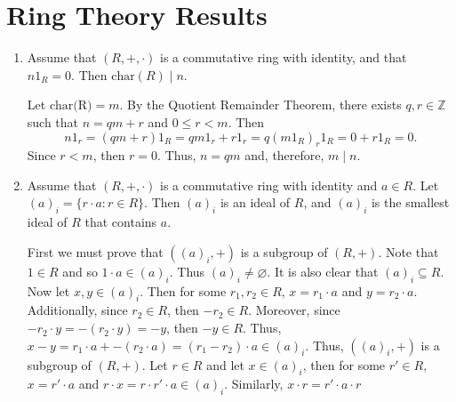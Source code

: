 \documentclass{article}
\makeatletter
\theoremstyle{definition}
\theoremstyle{remark}
\let\oldproofname=\proofname
\renewcommand{\proofname}{\bf{\textit{\oldproofname}}}
\theoremstyle{definition}
\renewenvironment{proof*}[1][\proofname]{\par
  \pushQED{\qed}%
  \normalfont \topsep6\p@\@plus6\p@\relax
  \list{}{\leftmargin=0mm
          \rightmargin=0mm
          \settowidth{\itemindent}{\itshape#1}%
          \labelwidth=\itemindent
          \parsep=0pt \listparindent=0mm%
  }
  \item[\hskip\labelsep
        \itshape
    #1\@addpunct{.}]\ignorespaces
}{%
  \popQED\endlist\@endpefalse
}
\makeatother
\begin{document}
    \section{Ring Theory Results}
        \begin{enumerate}[leftmargin=*]
            \item Assume that $(R,+,\cdot)$ is a commutative ring with identity, and that $n1_R=0$. Then $\text{char}(R)\mid n$.
                \begin{proof*}
                    Let $\text{char(R)}=m$. By the Quotient Remainder Theorem, there exists $q,r\in\mathbb{Z}$ such that $n=qm+r$ and $0\leq r <m$. Then 
                        \begin{equation*}
                            n1_r=(qm+r)1_R=qm1_r+r1_r=q(m1_R)_r1_R=0+r1_R=0.
                        \end{equation*}
                    Since $r<m$, then $r=0$. Thus, $n=qm$ and, therefore, $m\mid n$.
                \end{proof*}
                
            \item Assume that $(R,+,\cdot)$ is a commutative ring with identity and $a\in R$. Let $(a)_i=\{r\cdot a\colon r\in R\}$. Then $(a)_i$ is an ideal of $R$, and $(a)_i$ is the smallest ideal of $R$ that contains $a$.
                \begin{proof*}
                    First we must prove that $((a)_i, +)$ is a subgroup of $(R,+)$. Note that $1\in R$ and so $1\cdot a\in (a)_i$. Thus $(a)_i\neq \varnothing$. It is also clear that $(a)_i\subseteq R$. Now let $x,y\in (a)_i$. Then for some $r_1,r_2\in R$, $x=r_1\cdot a$ and $y=r_2\cdot a$. Additionally, since $r_2\in R$, then $-r_2\in R$. Moreover, since $-r_2\cdot y=-(r_2\cdot y)=-y$, then $-y\in R$. Thus, $x-y=r_1\cdot a+-(r_2\cdot a)=(r_1-r_2)\cdot a\in (a)_i$. Thus, $((a)_i,+)$ is a subgroup of $(R,+)$. Let $r\in R$ and let $x\in(a)_i$, then for some $r'\in R$, $x=r'\cdot a$ and $r\cdot x=r\cdot r'\cdot a\in(a)_i$. Similarly, $x\cdot r=r'\cdot a\cdot r$ 
                \end{proof*}
        \end{enumerate}
        
\end{document}
